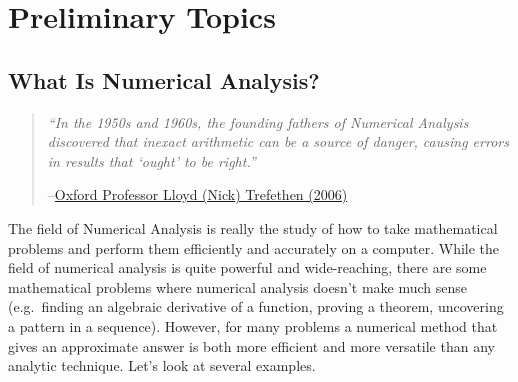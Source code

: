 \documentclass[
]{book}
\theoremstyle{definition}
\theoremstyle{definition}
\theoremstyle{definition}
\theoremstyle{remark}
\begin{document}
\hypertarget{ch:intro}{%
\chapter{Preliminary Topics}\label{ch:intro}}

\hypertarget{what-is-numerical-analysis}{%
\section{What Is Numerical Analysis?}\label{what-is-numerical-analysis}}

\begin{quote}
\emph{``In the 1950s and 1960s, the founding fathers of Numerical
Analysis discovered that inexact arithmetic can be a source of
danger, causing errors in results that `ought' to be right.''}

--\href{https://en.wikipedia.org/wiki/Nick_Trefethen}{Oxford Professor Lloyd (Nick) Trefethen
(2006)}
\end{quote}

The field of Numerical Analysis is really the study of how to take
mathematical problems and perform them efficiently and accurately on a
computer. While the field of numerical analysis is quite powerful and wide-reaching, there are some mathematical problems where numerical analysis doesn't make
much sense (e.g.~finding an algebraic derivative of a function, proving a theorem, uncovering a pattern in a sequence). However, for
many problems a numerical method that gives an approximate answer is
both more efficient and more versatile than any analytic technique. Let's look at several examples.
\end{document}
